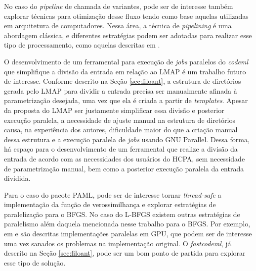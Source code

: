 \documentclass[cic,tc]{iiufrgs}
\begin{document}
No caso do \textit{pipeline} de chamada de variantes, pode ser de interesse
também explorar técnicas para otimização desse fluxo tendo como base aquelas
utilizadas em arquitetura de computadores. Nessa área, a técnica de
\textit{pipelining} é uma abordagem clássica, e diferentes estratégias podem
ser adotadas para realizar esse tipo de processamento, como aquelas descritas
em \cite{ramamoorthy1977pipeline}.

O desenvolvimento de um ferramental para execução de \textit{jobs} paralelos do
\textit{codeml} que simplifique a divisão da entrada em relação ao LMAP é um trabalho
futuro de interesse. Conforme descrito na Seção \ref{sec:filoant}, a estrutura
de diretórios gerada pelo LMAP para dividir a entrada precisa ser manualmente
afinada à parametrização desejada, uma vez que ela é criada a partir de
\textit{templates}. Apesar da proposta do LMAP ser justamente simplificar essa
divisão e posterior execução paralela, a necessidade de ajuste manual na
estrutura de diretórios causa, na experiência dos autores, dificuldade maior do
que a criação manual dessa estrutura e a execução paralela de \textit{jobs} usando GNU
Parallel. Dessa forma, há espaço para o desenvolvimento de um ferramental que
realize a divisão da entrada de acordo com as necessidades dos usuários do
HCPA, sem necessidade de parametrização manual, bem como a posterior execução
paralela da entrada dividida.

Para o caso do pacote PAML, pode ser de interesse tornar \textit{thread-safe} a
implementação da função de verossimilhança e explorar estratégias de
paralelização para o BFGS. No caso do L-BFGS existem outras estratégias de
paralelismo além daquela mencionada nesse trabalho para o BFGS. Por exemplo, em
\cite{fei2014parallel} e \cite{sanseverino2014cuda} são descritas
implementações paralelas em GPU, que podem ser de interesse uma vez sanados os
problemas na implementação original. O \textit{fastcodeml}, já descrito na Seção
\ref{sec:filoant}, pode ser um bom ponto de partida para explorar esse tipo de
solução.

%
%
%
%



\end{document}
